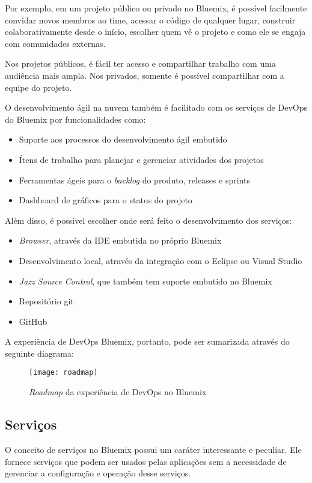 Por exemplo, em um projeto público ou privado no Bluemix, é possível facilmente convidar novos membros ao time, acessar o código de qualquer lugar, construir colaborativamente desde o início, escolher quem vê o projeto e como ele se engaja com comunidades externas.

Nos projetos públicos, é fácil ter acesso e compartilhar trabalho com uma audiência mais ampla. Nos privados, somente é possível compartilhar com a equipe do projeto.

O desenvolvimento ágil na nuvem também é facilitado com os serviços de DevOps do Bluemix por funcionalidades como:
\begin{itemize}
    \item Suporte aos processos do desenvolvimento ágil embutido
    \item Ítens de trabalho para planejar e gerenciar atividades dos projetos
    \item Ferramentas ágeis para o \textit{backlog} do produto, releases e sprints
    \item Dashboard de gráficos para o status do projeto
\end{itemize}

Além disso, é possível escolher onde será feito o desenvolvimento dos serviços:
\begin{itemize}
  \item \textit{Browser}, através da IDE embutida no próprio Bluemix
  \item Desenvolvimento local, através da integração com o Eclipse ou Visual Studio
  \item \textit{Jazz Source Control}, que também tem suporte embutido no Bluemix
  \item Repositório git
  \item GitHub
\end{itemize}
A experiência de DevOps Bluemix, portanto, pode ser sumarizada através do seguinte diagrama:
\begin{figure}[!htb]
    \centering
    \texttt{[image: roadmap]}
    \caption{\textit{Roadmap} da experiência de DevOps no Bluemix}
    \label{Rotulo}
\end{figure}

\subsection{Serviços}

O conceito de serviços no Bluemix possui um caráter interessante e peculiar. Ele fornece serviços que podem ser usados pelas aplicações sem a necessidade de gerenciar a configuração e operação desse serviços.

